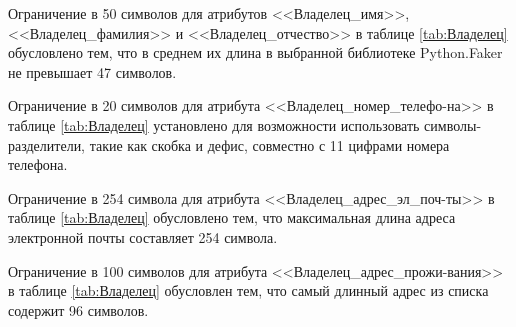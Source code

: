 \documentclass[a4paper]{article}
\begin{document}
\begin{table}[H]
  \caption{Порода - breed}
  \label{tab:Порода}
\end{table}

Ограничение в 50 символов для атрибутов <<Владелец\_имя>>, <<Владелец\_фамилия>> и <<Владелец\_отчество>> в таблице \ref{tab:Владелец} обусловлено тем, что в среднем их длина в выбранной библиотеке Python.Faker не превышает 47 символов. 

Ограничение в 20 символов для атрибута <<Владелец\_номер\_телефо-на>> в таблице \ref{tab:Владелец} установлено для возможности использовать символы-разделители, такие как скобка и дефис, совместно с 11 цифрами номера телефона.

Ограничение в 254 символа для атрибута <<Владелец\_адрес\_эл\_поч-ты>> в таблице \ref{tab:Владелец} обусловлено тем, что максимальная длина адреса электронной почты составляет 254 символа. 

Ограничение в 100 символов для атрибута <<Владелец\_адрес\_прожи-вания>> в таблице \ref{tab:Владелец} обусловлен тем, что самый длинный адрес из списка содержит 96 символов. 
\end{document}
